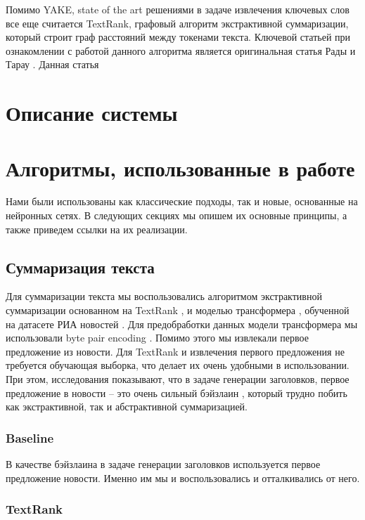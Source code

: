 \documentclass[14pt]{matmex-diploma-custom}
\begin{document}
Помимо YAKE, state of the art решениями в задаче извлечения ключевых слов все еще считается TextRank, графовый алгоритм экстрактивной суммаризации, который строит граф расстояний между токенами текста. Ключевой статьей при ознакомлении с работой данного алгоритма является оригинальная статья Рады и Тарау \cite{TextrankOriginal}. Данная статья

\section{Описание системы}

\section{Алгоритмы, использованные в работе}
Нами были использованы как классические подходы, так и новые, основанные на нейронных сетях.
В следующих секциях мы опишем их основные принципы, а также приведем ссылки на их реализации.

\subsection{Суммаризация текста}
Для суммаризации текста мы воспользовались алгоритмом экстрактивной суммаризации
основанном на TextRank \cite{DBLP:journals/corr/BarriosLAW16, rehurek_lrec, TextrankOriginal},
и моделью трансформера \cite{DBLP:journals/corr/VaswaniSPUJGKP17}, обученной на
датасете РИА новостей \cite{gavrilov2018self}.
Для предобработки данных модели трансформера мы использовали byte
pair encoding \cite{DBLP:journals/corr/SennrichHB15}.
Помимо этого мы извлекали первое предложение из новости.
Для TextRank и извлечения первого предложения не требуется обучающая выборка, что
делает их очень удобными в использовании. При этом, исследования показывают, что
в задаче генерации заголовков, первое предложение в новости --
это очень сильный бэйзлаин \cite{gavrilov2018self},
который трудно побить как экстрактивной, так и абстрактивной суммаризацией.

\subsubsection{Baseline}

В качестве бэйзлаина в задаче генерации заголовков используется первое предложение новости. Именно им мы и воспользовались и отталкивались от него.


\subsubsection{TextRank}
\end{document}
